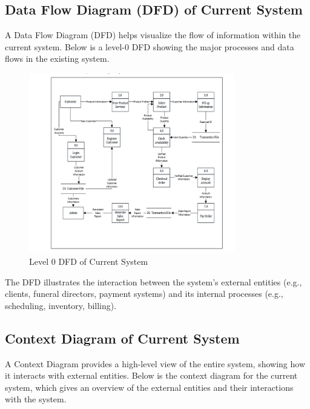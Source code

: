 \documentclass[a4paper,12pt]{report}
\begin{document}
\subsection{Data Flow Diagram (DFD) of Current System}
A Data Flow Diagram (DFD) helps visualize the flow of information within the current system. Below is a level-0 DFD showing the major processes and data flows in the existing system.

\begin{figure}[ht]
\centering
\includegraphics[width=0.8\textwidth]{../img/activity.png}
\caption{Level 0 DFD of Current System}
\label{fig:dfd_level_0}
\end{figure}

The DFD illustrates the interaction between the system’s external entities (e.g., clients, funeral directors, payment systems) and its internal processes (e.g., scheduling, inventory, billing).

\subsection{Context Diagram of Current System}
A Context Diagram provides a high-level view of the entire system, showing how it interacts with external entities. 
Below is the context diagram for the current system, which gives an overview of the external entities and their interactions with the system.

\end{document}
